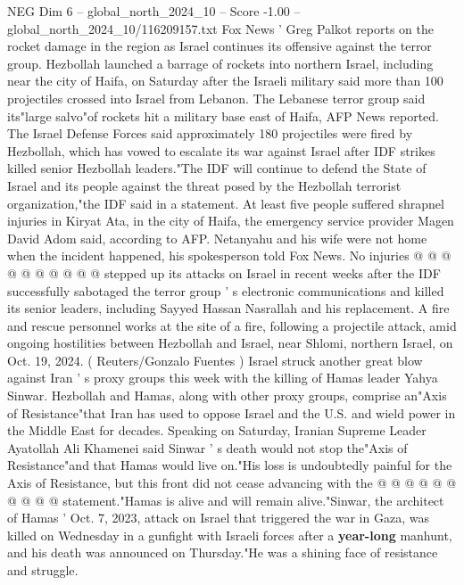 \begin{textsample}{NEG Dim 6 – global\_north\_2024\_10 – Score -1.00 – global\_north\_2024\_10/116209157.txt}  \label{ex:f6_neg_078}
Fox News ' Greg Palkot reports on the rocket damage in the region as Israel continues its offensive against the terror group.
Hezbollah launched a barrage of rockets into northern Israel, including near the city of Haifa, on Saturday after the Israeli military said more than 100 projectiles crossed into Israel from Lebanon.
The Lebanese terror group said its"large salvo"of rockets hit a military base east of Haifa, AFP News reported.
The Israel Defense Forces said approximately 180 projectiles were fired by Hezbollah, which has vowed to escalate its war against Israel after IDF strikes killed senior Hezbollah leaders."The IDF will continue to defend the State of Israel and its people against the threat posed by the Hezbollah terrorist organization,"the IDF said in a statement.
At least five people suffered shrapnel injuries in Kiryat Ata, in the city of Haifa, the emergency service provider Magen David Adom said, according to AFP.
Netanyahu and his wife were not home when the incident happened, his spokesperson told Fox News.
No injuries @ @ @ @ @ @ @ @ @ @ stepped up its attacks on Israel in recent weeks after the IDF successfully sabotaged the terror group ' s electronic communications and killed its senior leaders, including Sayyed Hassan Nasrallah and his replacement.
A fire and rescue personnel works at the site of a fire, following a projectile attack, amid ongoing hostilities between Hezbollah and Israel, near Shlomi, northern Israel, on Oct. 19, 2024. ( Reuters/Gonzalo Fuentes ) Israel struck another great blow against Iran ' s proxy groups this week with the killing of Hamas leader Yahya Sinwar.
Hezbollah and Hamas, along with other proxy groups, comprise an"Axis of Resistance"that Iran has used to oppose Israel and the U.S. and wield power in the Middle East for decades.
Speaking on Saturday, Iranian Supreme Leader Ayatollah Ali Khamenei said Sinwar ' s death would not stop the"Axis of Resistance"and that Hamas would live on."His loss is undoubtedly painful for the Axis of Resistance, but this front did not cease advancing with the @ @ @ @ @ @ @ @ @ @ statement."Hamas is alive and will remain alive."Sinwar, the architect of Hamas ' Oct. 7, 2023, attack on Israel that triggered the war in Gaza, was killed on Wednesday in a gunfight with Israeli forces after a \textbf{year-long} manhunt, and his death was announced on Thursday."He was a shining face of resistance and struggle.

\end{textsample}
